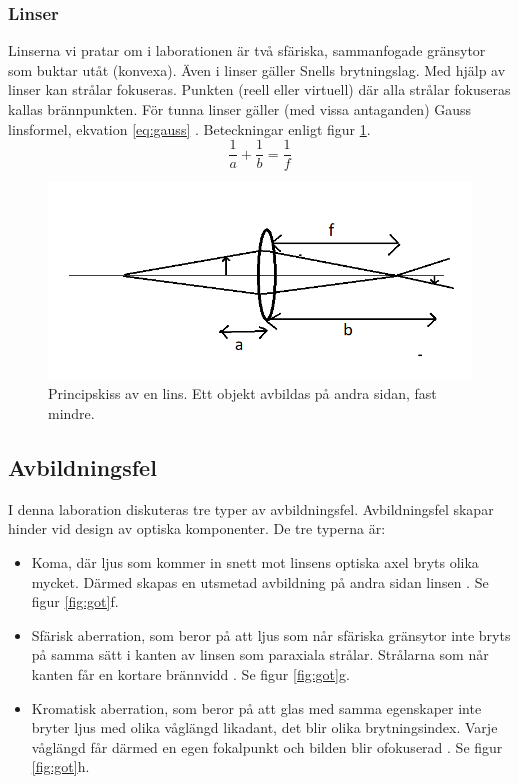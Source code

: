 \documentclass[a4paper]{article}
\begin{document}
\subsubsection{Linser}
Linserna vi pratar om i laborationen är två sfäriska, sammanfogade gränsytor som buktar utåt (konvexa). Även i linser gäller 
Snells brytningslag. Med hjälp av linser kan strålar fokuseras. Punkten (reell eller virtuell) där alla strålar fokuseras
kallas brännpunkten. För tunna linser gäller (med vissa antaganden) Gauss linsformel, ekvation \ref{eq:gauss} \cite[p.230]{vl}. Beteckningar enligt
figur \ref{fig:lens}.
\begin{equation}
    \frac{1}{a} + \frac{1}{b} = \frac{1}{f}
    \label{eq:gauss}
\end{equation}
\begin{figure}[h!]
    \includegraphics[height=0.3\textheight]{lens.png}
    \caption{Principskiss av en lins. Ett objekt avbildas på andra sidan, fast mindre.}
    \label{fig:lens}
\end{figure}
\subsection{Avbildningsfel}
I denna laboration diskuteras tre typer av avbildningsfel. Avbildningsfel skapar hinder vid design av optiska komponenter.
De tre typerna är:
\begin{itemize}
    \item Koma, där ljus som kommer in snett mot linsens optiska axel bryts olika mycket. Därmed skapas en utsmetad
    avbildning på andra sidan linsen \cite{ins}. Se figur \ref{fig:got}f.
    \item Sfärisk aberration, som beror på att ljus som når sfäriska gränsytor inte bryts på samma sätt i kanten av linsen som paraxiala strålar.
    Strålarna som når kanten får en kortare brännvidd \cite[p.238]{vl}. Se figur \ref{fig:got}g.
    \item Kromatisk aberration, som beror på att glas med samma egenskaper inte bryter ljus med olika våglängd
    likadant, det blir olika brytningsindex. Varje våglängd får därmed en egen fokalpunkt och bilden blir ofokuserad  \cite[p.237]{vl}. Se figur \ref{fig:got}h.
\end{itemize}
\end{document}
